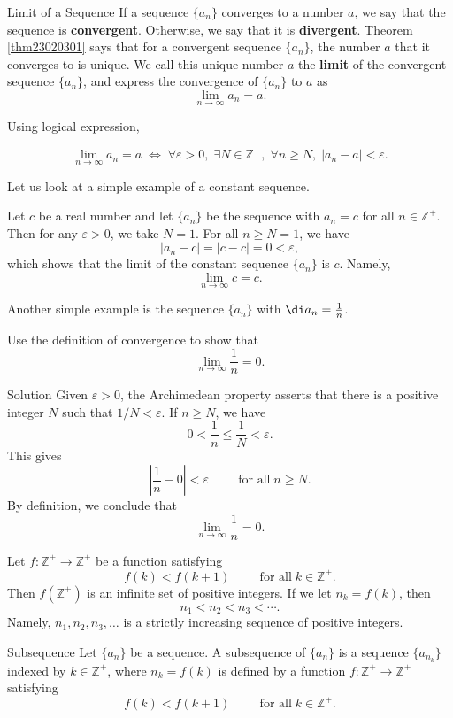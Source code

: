 \begin{highlight}{Limit of a Sequence}
If a sequence $\{a_n\}$ converges to a number $a$, we say that the sequence is \textbf{convergent}. Otherwise, we say that it is \textbf{divergent}. Theorem \ref{thm23020301} says that for a convergent sequence $\{a_n\}$, the number $a$ that it converges to is unique. We call this unique number $a$ the \textbf{limit} of the convergent sequence $\{a_n\}$, and express the convergence of $\{a_n\}$ to $a$ as
\[\lim_{n\rightarrow\infty}a_n=a.\]

\end{highlight}


Using logical expression,     
\begin{highlight}{}
\[\lim_{n\rightarrow\infty}a_n=a\;\iff\; \forall \varepsilon>0, \;\exists N\in \mathbb{Z}^+, \;\forall n\geq N,\; |a_n-a|<\varepsilon.\]
 \end{highlight}
Let us look at a simple example of a constant sequence.

\begin{example}{}
Let $c$ be a real number and let $\{a_n\}$ be the sequence with $a_n=c$ for all $n\in\mathbb{Z}^+$. Then for any $\varepsilon>0$, we take $N=1$. For all $n\geq N=1$, we have
\[|a_n-c|=|c-c|=0<\varepsilon,\] which shows that
the limit of the constant sequence $\{a_n\}$   is $c$. Namely,
\[\lim_{n\rightarrow\infty}c=c.\]

\end{example}
Another simple example is the sequence $\{a_n\}$ with $\di a_n=\frac{1}{n}$.
\begin{example}[label=ex23020305]{}
Use the definition of convergence to show that 
\[\lim_{n\rightarrow\infty}\frac{1}{n}=0.\]
\end{example}
\begin{solution}{Solution}
Given $\varepsilon>0$, the Archimedean property asserts that there is a positive integer $N$ such that $1/N<\varepsilon$. If $n\geq N$, we have   
\[0<\frac{1}{n}\leq\frac{1}{N}<\varepsilon.\] 
This gives
\[\left|\frac{1}{n}-0\right|<\varepsilon\hspace{1cm}\text{for all}\;n\geq N.\]
By definition, we conclude that
\[\lim_{n\rightarrow\infty}\frac{1}{n}=0.\]
\end{solution}



Let $f:\mathbb{Z}^+\rightarrow\mathbb{Z}^+$ be a function satisfying
\[f(k)<f(k+1)\hspace{1cm}\text{for all}\;k\in \mathbb{Z}^+.\]
Then $f(\mathbb{Z}^+)$ is an infinite set of positive integers.   If we let
$n_k=f(k)$, then
\[n_1<n_2<n_3<\cdots.\]Namely, $n_1, n_2, n_3, \ldots$ is a strictly increasing sequence of positive integers. 
\begin{definition}{Subsequence}
Let $\{a_n\}$ be a sequence. A subsequence of $\{a_n\}$ is a sequence $\{a_{n_k}\}$ indexed by $k\in\mathbb{Z}^+$, where $n_k=f(k)$ is defined by a function $f:\mathbb{Z}^+\rightarrow\mathbb{Z}^+$  satisfying
\[f(k)<f(k+1)\hspace{1cm}\text{for all}\;k\in \mathbb{Z}^+.\]
\end{definition}

